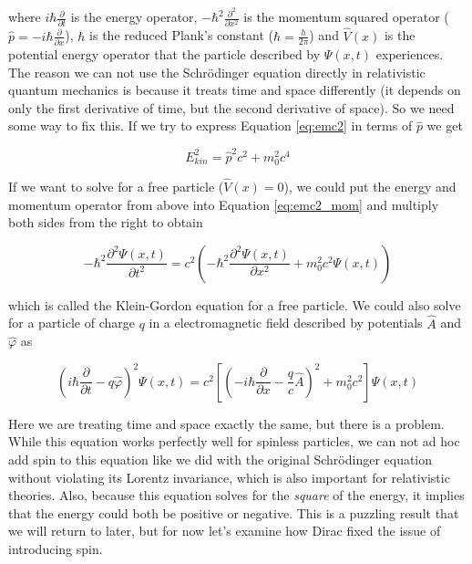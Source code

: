 \documentclass[12pt]{report}
\begin{document}
where $i\hbar\frac{\partial}{\partial t}$ is the energy operator, $-\hbar^{2}\frac{\partial^{2}}{\partial x^{2}}$ is the momentum squared operator ($\hat{p} = -i\hbar\frac{\partial}{\partial x}$), $\hbar$ is the reduced Plank's constant ($\hbar = \frac{h}{2\pi}$) and $\hat{V}(x)$ is the potential energy operator that the particle described by $\Psi(x, t)$ experiences. The reason we can not use the Schr\"{o}dinger equation directly in relativistic quantum mechanics is because it treats time and space differently (it depends on only the first derivative of time, but the second derivative of space). So we need some way to fix this. If we try to express Equation \ref{eq:emc2} in terms of $\hat{p}$ we get\cite{Piela}

\begin{equation}
\label{eq:emc2_mom}
E_{kin}^{2} = \hat{p}^{2}c^{2} + m_{0}^{2}c^{4}
\end{equation}

If we want to solve for a free particle ($\hat{V}(x) = 0$), we could put the energy and momentum operator from above into Equation \ref{eq:emc2_mom} and multiply both sides from the right to obtain

\begin{equation}
\label{eq:klein-gord_free}
-\hbar^{2}\frac{\partial^{2}\Psi(x,t)}{\partial t^{2}} = c^{2}\left(-\hbar^{2}\frac{\partial^{2}\Psi(x, t)}{\partial x^{2}} + m_{0}^{2}c^{2}\Psi(x,t)\right)
\end{equation}

which is called the Klein-Gordon\cite{Gordon1926, Klein1927} equation for a free particle. We could also solve for a particle of charge $q$ in a electromagnetic field described by potentials $\hat{A}$ and $\hat{\varphi}$ as

\begin{equation}
\label{eq:klein-gord_elec_mag}
\left(i\hbar\frac{\partial}{\partial t} -q\hat{\varphi}\right)^{2}\Psi(x, t) = c^{2}\left[\left(-i\hbar\frac{\partial}{\partial x} - \frac{q}{c}\hat{A}\right)^{2} + m_{0}^{2}c^{2}\right]\Psi(x,t)
\end{equation}

Here we are treating time and space exactly the same, but there is a problem. While this equation works perfectly well for spinless particles, we can not ad hoc add spin to this equation like we did with the original Schr\"{o}dinger equation without violating its Lorentz invariance, which is also important for relativistic theories. Also, because this equation solves for the \textit{square} of the energy, it implies that the energy could both be positive or negative. This is a puzzling result that we will return to later, but for now let's examine how Dirac fixed the issue of introducing spin. 
\end{document}
